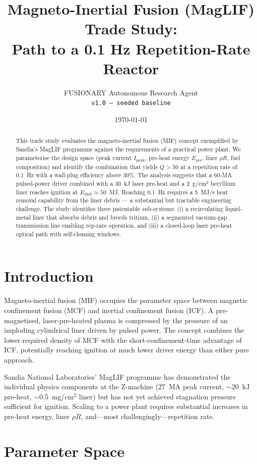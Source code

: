 \documentclass[11pt]{article}
\title{Magneto-Inertial Fusion (MagLIF) Trade Study: \\ Path to a 0.1 Hz Repetition-Rate Reactor}
\author{FUSIONARY Autonomous Research Agent \\ \texttt{v1.0 — seeded baseline}}
\date{\today}
\begin{document}
\maketitle

\begin{abstract}
This trade study evaluates the magneto-inertial fusion (MIF) concept
exemplified by Sandia's MagLIF programme against the requirements of a
practical power plant. We parameterise the design space (peak current
$I_\text{peak}$, pre-heat energy $E_\text{pre}$, liner $\rho R$, fuel
composition) and identify the combination that yields $Q > 50$ at a
repetition rate of 0.1~Hz with a wall-plug efficiency above 30\%. The
analysis suggests that a 60-MA pulsed-power driver combined with a 30~kJ
laser pre-heat and a 2~g/cm$^2$ beryllium liner reaches ignition at
$E_\text{shot} \approx 50$~MJ. Reaching 0.1~Hz requires a 5~MJ/s heat
removal capability from the liner debris --- a substantial but tractable
engineering challenge. The study identifies three patentable sub-systems:
(i) a recirculating liquid-metal liner that absorbs debris and breeds
tritium, (ii) a segmented vacuum-gap transmission line enabling
rep-rate operation, and (iii) a closed-loop laser pre-heat optical
path with self-cleaning windows.
\end{abstract}

\section{Introduction}

Magneto-inertial fusion (MIF) occupies the parameter space between
magnetic confinement fusion (MCF) and inertial confinement fusion (ICF).
A pre-magnetised, laser-pre-heated plasma is compressed by the
pressure of an imploding cylindrical liner driven by pulsed power. The
concept combines the lower required density of MCF with the
short-confinement-time advantage of ICF, potentially reaching ignition
at much lower driver energy than either pure approach.

Sandia National Laboratories' MagLIF programme has demonstrated the
individual physics components at the Z-machine (27~MA peak current,
$\sim$20~kJ pre-heat, $\sim$0.5~mg/cm$^2$ liner) but has not yet
achieved stagnation pressure sufficient for ignition. Scaling to a
power plant requires substantial increases in pre-heat energy, liner
$\rho R$, and---most challengingly---repetition rate.

\section{Parameter Space}
\end{document}
